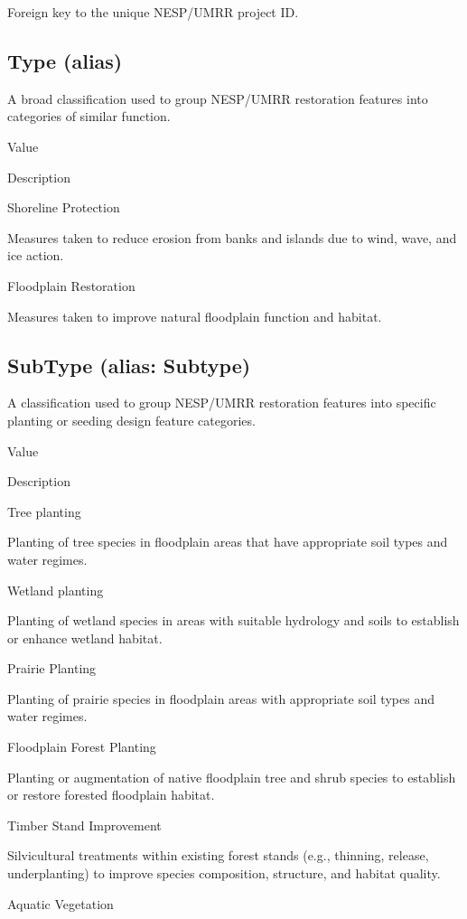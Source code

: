 \documentclass[
  letterpaper,
  DIV=11,
  numbers=noendperiod]{scrreprt}
\begin{document}
Foreign key to the unique NESP/UMRR project ID.

\subsection{Type (alias)}\label{type-alias-4}

A broad classification used to group NESP/UMRR restoration features into
categories of similar function.

Value

Description

Shoreline Protection

Measures taken to reduce erosion from banks and islands due to wind,
wave, and ice action.

Floodplain Restoration

Measures taken to improve natural floodplain function and habitat.

\subsection{SubType (alias: Subtype)}\label{subtype-alias-subtype-4}

A classification used to group NESP/UMRR restoration features into
specific planting or seeding design feature categories.

Value

Description

Tree planting

Planting of tree species in floodplain areas that have appropriate soil
types and water regimes.

Wetland planting

Planting of wetland species in areas with suitable hydrology and soils
to establish or enhance wetland habitat.

Prairie Planting

Planting of prairie species in floodplain areas with appropriate soil
types and water regimes.

Floodplain Forest Planting

Planting or augmentation of native floodplain tree and shrub species to
establish or restore forested floodplain habitat.

Timber Stand Improvement

Silvicultural treatments within existing forest stands (e.g., thinning,
release, underplanting) to improve species composition, structure, and
habitat quality.

Aquatic Vegetation
\end{document}
